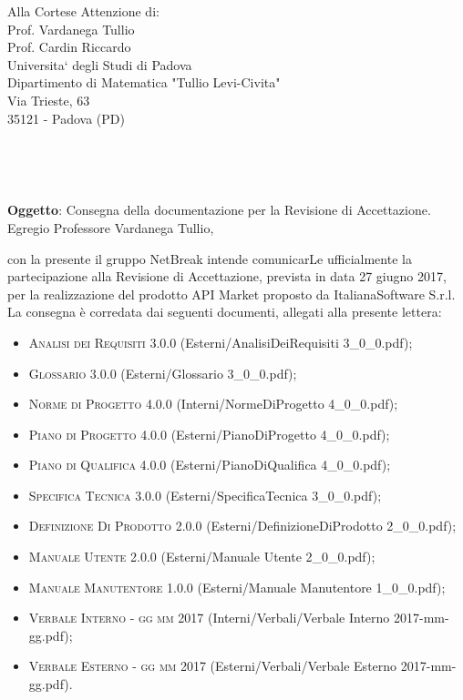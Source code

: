 \documentclass[11pt,a4paper]{letter}
\def\opening#1{\thispagestyle{empty}
{\centering\fromaddress \vspace{0.6in} \\ %
\hspace*{\longindentation}\hspace*{\fill}\par} %
{\raggedright \toname \\ \toaddress \par} %
\vspace{0.1in} %
\noindent #1 %
}
\begin{document}

\begin{letter}
{Alla Cortese Attenzione di:\\
	Prof. Vardanega Tullio\\
	Prof. Cardin Riccardo\\
	Universita` degli Studi di Padova\\
	Dipartimento di Matematica "Tullio Levi-Civita"\\
	Via Trieste, 63\\
	35121 - Padova (PD)\\
}


\opening{\textbf{Oggetto}: Consegna della documentazione per la Revisione di Accettazione.}\\

\noindent Egregio Professore Vardanega Tullio,

\indent con la presente il gruppo NetBreak intende comunicarLe ufficialmente la partecipazione alla Revisione di Accettazione, prevista in data 27 giugno 2017, per la realizzazione del prodotto API Market proposto da ItalianaSoftware S.r.l.\\
La consegna \`e corredata dai seguenti documenti, allegati alla presente lettera:

\begin{itemize}
	\item \textsc{Analisi dei Requisiti 3.0.0} (Esterni/AnalisiDeiRequisiti 3\_0\_0.pdf); 
	\item \textsc{Glossario 3.0.0} (Esterni/Glossario 3\_0\_0.pdf); 
	\item \textsc{Norme di Progetto 4.0.0} (Interni/NormeDiProgetto 4\_0\_0.pdf); 
	\item \textsc{Piano di Progetto 4.0.0} (Esterni/PianoDiProgetto 4\_0\_0.pdf); 
	\item \textsc{Piano di Qualifica 4.0.0} (Esterni/PianoDiQualifica 4\_0\_0.pdf); 
	\item \textsc{Specifica Tecnica 3.0.0} (Esterni/SpecificaTecnica 3\_0\_0.pdf);
	\item \textsc{Definizione Di Prodotto 2.0.0} (Esterni/DefinizioneDiProdotto 2\_0\_0.pdf);
	\item \textsc{Manuale Utente 2.0.0} (Esterni/Manuale Utente 2\_0\_0.pdf);
	\item \textsc{Manuale Manutentore 1.0.0} (Esterni/Manuale Manutentore 1\_0\_0.pdf);
	\item \textsc{Verbale Interno - gg mm 2017} (Interni/Verbali/Verbale Interno 2017-mm-gg.pdf);
	\item \textsc{Verbale Esterno - gg mm 2017} (Esterni/Verbali/Verbale Esterno 2017-mm-gg.pdf). 
\end{itemize}


\end{letter}
\end{document}
